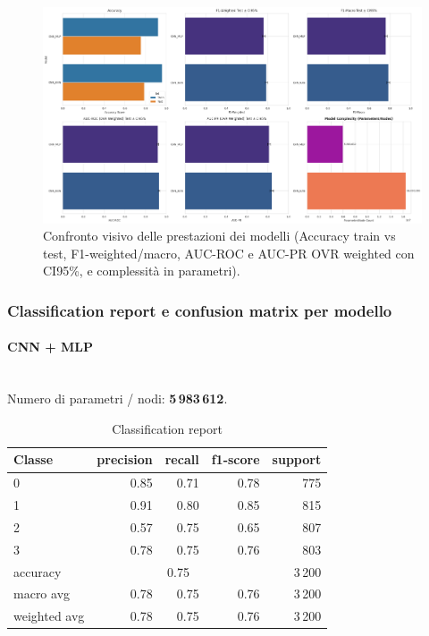 \documentclass[a4paper,12pt]{report}
\begin{document}
	\begin{figure}[H]
		\centering
		\includegraphics[width=1.0\textwidth]{img/comparison_image.png}
		\caption{Confronto visivo delle prestazioni dei modelli (Accuracy train vs test, F1-weighted/macro, AUC-ROC e AUC-PR OVR weighted con CI95\%, e complessità in parametri).}
		\label{fig:comparison_image}
	\end{figure}
	
	\subsubsection{Classification report e confusion matrix per modello}
	
	\paragraph{CNN + MLP} \mbox{}\\
	Numero di parametri / nodi: \textbf{5\,983\,612}.
	
	\begin{table}[H]
		\centering
		\caption{Classification report}
		\label{tab:cr_cnn_mlp}
		\begin{tabular}{lrrrr}
			\toprule
			Classe & precision & recall & f1-score & support \\
			\midrule
			0 & 0.85 & 0.71 & 0.78 & 775 \\
			1 & 0.91 & 0.80 & 0.85 & 815 \\
			2 & 0.57 & 0.75 & 0.65 & 807 \\
			3 & 0.78 & 0.75 & 0.76 & 803 \\
			\midrule
			accuracy & \multicolumn{3}{c}{0.75} & 3\,200 \\
			macro avg & 0.78 & 0.75 & 0.76 & 3\,200 \\
			weighted avg & 0.78 & 0.75 & 0.76 & 3\,200 \\
			\bottomrule
		\end{tabular}
	\end{table}
	
\end{document}
